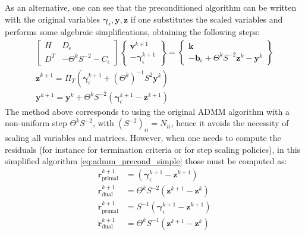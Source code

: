 \documentclass[final,3p]{elsarticle}
\newcommand{\vect}[1]{\bm{#1}}
\begin{document}
As an alternative, one can see that the preconditioned algorithm can be written with the original variables $\vect{\gamma}_\epsilon, \vect{y}, \vect{z}$ if one substitutes the scaled variables and performs some algebraic simplifications, obtaining the following steps:
\begin{subequations}
\begin{align}
\begin{bmatrix}
			 H   & D_\epsilon \\
			 D^T & - \Theta^k S^{-2} - C_\epsilon
			\end{bmatrix}
			\begin{Bmatrix}
				\vect{v}^{k+1}  \\
			 -\vect{\gamma}_\epsilon^{k+1}
			\end{Bmatrix}
			=
			\begin{Bmatrix}
			 \vect{k} \\
			 -\vect{b}_\epsilon + \Theta^k S^{-2} \vect{z}^k - \vect{y}^k 
			\end{Bmatrix} \\
	  \vect{z}^{k+1} = \Pi_\Upsilon \left(  \vect{\gamma}_\epsilon^{k+1} +(\Theta^k)^{-1} S^{2} \vect{y}^k \right ) \\
		\vect{y}^{k+1} = \vect{y}^k + \Theta^k S^{-2} \left( \vect{\gamma}_\epsilon^{k+1} - \vect{z}^{k+1} \right)
\end{align}
\label{eq:admm_precond_simple}
\end{subequations}
%
The method above corresponds to using the original ADMM algorithm with a non-uniform step $\Theta^k S^{-2}$, with $(S^{-2})_{ii} = {N_{ii}}$, hence it avoids the necessity of scaling all variables and matrices. However, when one needs to compute the residuals (for instance for termination criteria or for step scaling policies), in this simplified algorithm \eqref{eq:admm_precond_simple} those must be computed as:
%
\begin{align}
\vect{r}_{\text{primal}}^{k+1} &= \left( \vect{\gamma}_\epsilon^{k+1}-\vect{z}^{k+1} \right) \nonumber \\
\vect{r}_{\text{dual}}^{k+1}   &= \Theta^k S^{-2} (\vect{z}^{k+1} - \vect{z}^{k}) \nonumber \\
\breve{\vect{r}}_{\text{primal}}^{k+1} &= S^{-1} \left( \vect{\gamma}_\epsilon^{k+1}-\vect{z}^{k+1} \right) \nonumber \\
\breve{\vect{r}}_{\text{dual}}^{k+1}   &= \Theta^k S^{-1} (\vect{z}^{k+1} - \vect{z}^{k}) \nonumber
\end{align}
\end{document}
